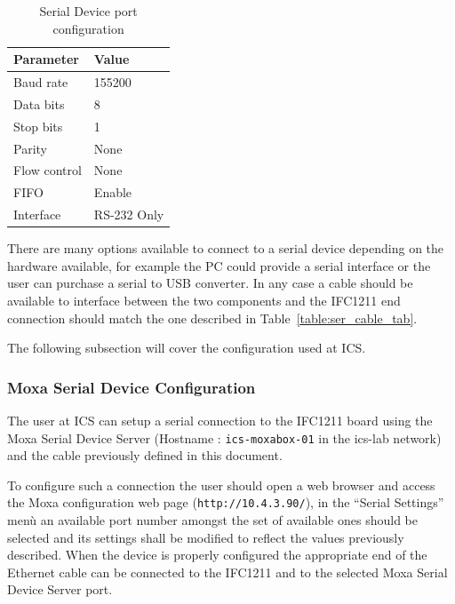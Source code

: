 \documentclass[11pt
  , a4paper
  , article
  , oneside
  , showtrims
]{memoir}
\begin{document}
\begin{table}[!htb]
	\centering
	\begin{tabular}{l|l}
		\toprule\rowcolor{gray!15}
		Parameter          & Value                        \\\midrule
		Baud rate          & 155200                       \\\midrule
		Data bits          & 8                            \\\midrule
		Stop bits          & 1                            \\\midrule
		Parity             & None                         \\\midrule
		Flow control       & None                         \\\midrule
		FIFO               & Enable                       \\\midrule
		Interface          & RS-232 Only                  \\\bottomrule
	\end{tabular}
	\caption[]{Serial Device port configuration}
	\label{table:moxa_serial}
\end{table}

There are many options available to connect to a serial device depending on the hardware available, for example the PC could provide a serial interface or the user can purchase a serial to USB converter. In any case a cable should be available to interface between the two components and the IFC1211 end connection should match the one described in Table~\ref{table:ser_cable_tab}.

The following subsection will cover the configuration used at ICS.

\subsubsection{Moxa Serial Device Configuration}
The user at ICS can setup a serial connection to the IFC1211 board using the Moxa Serial Device Server (Hostname : \texttt{ics-moxabox-01} in the ics-lab network) and the cable previously defined in this document.

To configure such a connection the user should open a web browser and access the Moxa configuration web page (\texttt{http://10.4.3.90/}), in the ``Serial Settings'' men\`u an available port number amongst the set of available ones should be selected and its settings shall be modified to reflect the values previously described. When the device is properly configured the appropriate end of the Ethernet cable can be connected to the IFC1211 and to the selected Moxa Serial Device Server port.
\end{document}
